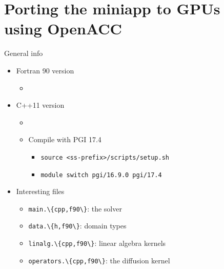 \documentclass[12pt,aspectratio=169]{beamer}
\newcommand\shinline[2][]{\lstinline[style=shstyle,basicstyle=\ttfamily,#1]!#2!}
\begin{document}
\part{Porting the miniapp to GPUs using OpenACC}

\begin{frame}[fragile]{General info}
  \begin{itemize}
  \item Fortran 90 version
    \begin{itemize}
    \item {}
    \end{itemize}
  \item C++11 version
    \begin{itemize}
    \item {}
    \item Compile with PGI 17.4
      \begin{itemize}
        \item\shinline{source <ss-prefix>/scripts/setup.sh}
        \item\shinline{module switch pgi/16.9.0 pgi/17.4}
      \end{itemize}
    \end{itemize}
  \item Interesting files
    \begin{itemize}
    \item\shinline{main.\{cpp,f90\}}: the solver
    \item\shinline{data.\{h,f90\}}: domain types
    \item\shinline{linalg.\{cpp,f90\}}: linear algebra kernels
    \item\shinline{operators.\{cpp,f90\}}: the diffusion kernel
    \end{itemize}
  \end{itemize}
\end{frame}
\end{document}
